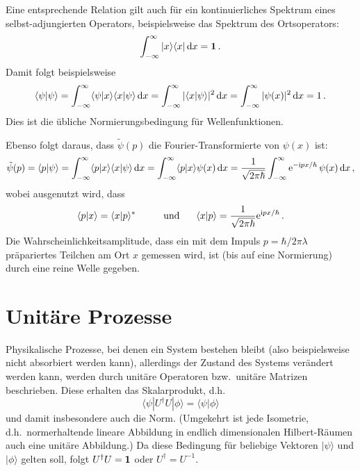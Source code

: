Eine entsprechende Relation gilt auch f\"ur ein kontinuierliches Spektrum eines
selbst-adjungierten Operators, beispielsweise das Spektrum des Ortsoperators:
\begin{equation}
             \int_{-\infty}^\infty | x \rangle \langle x |  \, {\rm d}x= {\bf 1} \, .
\end{equation}
Damit folgt beispielsweise
\begin{equation}
      \langle \psi| \psi \rangle = \int_{-\infty}^\infty \langle \psi |x \rangle \langle x | \psi \rangle \, {\rm d}x
              = \int_{-\infty}^\infty  | \langle x | \psi \rangle |^2 \,{\rm d}x  
              = \int_{-\infty}^\infty  | \psi(x)|^2 \,{\rm d}x = 1 \,  .
\end{equation}
Dies ist die \"ubliche Normierungsbedingung f\"ur Wellenfunktionen.

Ebenso folgt daraus, dass $\tilde{\psi}(p)$ die Fourier-Transformierte von $\psi(x)$ ist:
\begin{equation}
      \tilde{\psi}(p) = \langle p | \psi \rangle = \int_{-\infty}^\infty \langle p |x \rangle \langle x | \psi \rangle \, {\rm d}x
              = \int_{-\infty}^\infty   \langle p | x \rangle  \psi(x) \,{\rm d}x = \frac{1}{\sqrt{2\pi \hbar}}
              \int_{-\infty}^\infty  {\rm e}^{-{\rm i}px/\hbar} \, \psi(x) \,{\rm d}x  \,  ,
\end{equation}
wobei ausgenutzt wird, dass
\begin{equation}
           \langle p|x\rangle = \langle x|p\rangle^* \hspace{1cm} {\rm und} \hspace{0.6cm}
           \langle x | p \rangle = \frac{1}{\sqrt{2\pi \hbar}} {\rm e}^{{\rm i} p x/\hbar}  \, .
\end{equation}
Die Wahrscheinlichkeitsamplitude, dass ein mit dem Impuls $p=\hbar/2\pi \lambda$ pr\"apariertes
Teilchen am Ort $x$ gemessen wird, ist (bis auf eine Normierung) durch eine reine Welle gegeben.

\section{Unit\"are Prozesse}

Physikalische Prozesse, bei denen ein System bestehen bleibt (also beispielsweise nicht
absorbiert werden kann), allerdings der Zustand des Systems ver\"andert werden kann,
werden durch unit\"are Operatoren bzw.\ unit\"are Matrizen beschrieben. Diese erhalten
das Skalarprodukt, d.h.
\begin{equation}
          \langle \psi | U^\dagger U| \phi \rangle = \langle \psi | \phi \rangle 
\end{equation} 
und damit insbesondere auch die Norm. (Umgekehrt ist jede Isometrie, d.h.\ normerhaltende
lineare Abbildung in endlich dimensionalen Hilbert-R\"aumen auch eine unit\"are Abbildung.)
Da diese Bedingung f\"ur beliebige Vektoren $|\psi\rangle$ und $|\phi\rangle$ gelten soll, 
folgt $U^\dagger U = {\bf 1}$ oder $U^\dagger = U^{-1}$. 

